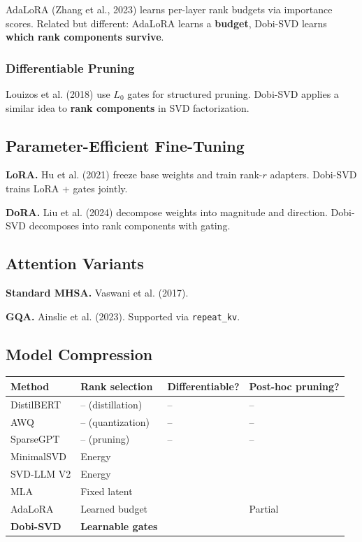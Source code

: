 AdaLoRA (Zhang et al., 2023) learns per-layer rank budgets via 
importance scores. Related but different: AdaLoRA learns a \textbf{budget}, 
Dobi-SVD learns \textbf{which rank components survive}.

\subsubsection{Differentiable Pruning}

Louizos et al. (2018) use $L_0$ gates for structured pruning. Dobi-SVD 
applies a similar idea to \textbf{rank components} in SVD factorization.

\subsection{Parameter-Efficient Fine-Tuning}

\textbf{LoRA.} Hu et al. (2021) freeze base weights and train rank-$r$ adapters. 
Dobi-SVD trains LoRA + gates jointly.

\textbf{DoRA.} Liu et al. (2024) decompose weights into magnitude and direction. 
Dobi-SVD decomposes into rank components with gating.

\subsection{Attention Variants}

\textbf{Standard MHSA.} Vaswani et al. (2017).

\textbf{GQA.} Ainslie et al. (2023). Supported via \texttt{repeat\_kv}.

\subsection{Model Compression}

\begin{table}[H]
\centering
\small
\begin{tabular}{llll}
\toprule
\textbf{Method} & \textbf{Rank selection} & \textbf{Differentiable?} & \textbf{Post-hoc pruning?} \\
\midrule
DistilBERT & -- (distillation) & -- & -- \\
AWQ & -- (quantization) & -- & -- \\
SparseGPT & -- (pruning) & -- & -- \\
MinimalSVD & Energy &  &  \\
SVD-LLM V2 & Energy &  &  \\
MLA & Fixed latent &  &  \\
AdaLoRA & Learned budget &  & Partial \\
\textbf{Dobi-SVD} & \textbf{Learnable gates} & \textbf{ } & \textbf{ } \\
\bottomrule
\end{tabular}
\end{table}

